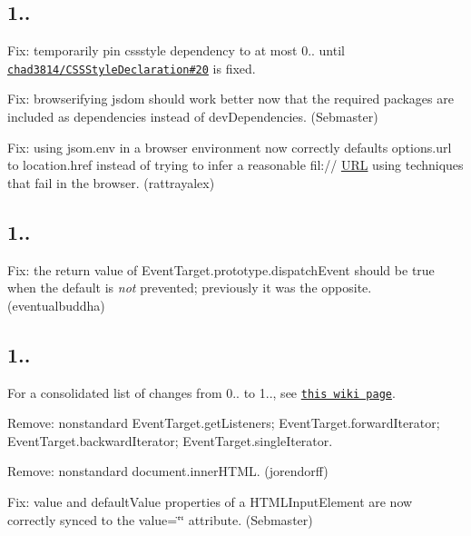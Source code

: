 \subsection*{1..}


\begin{DoxyItemize}
\item Fix\+: temporarily pin {\ttfamily cssstyle} dependency to at most 0.. until \href{https://github.com/chad3814/CSSStyleDeclaration/issues/20}{\tt chad3814/\+C\+S\+S\+Style\+Declaration\#20} is fixed.
\item Fix\+: browserifying jsdom should work better now that the required packages are included as {\ttfamily dependencies} instead of {\ttfamily dev\+Dependencies}. (Sebmaster)
\item Fix\+: using {\ttfamily jsom.\+env} in a browser environment now correctly defaults {\ttfamily options.\+url} to {\ttfamily location.\+href} instead of trying to infer a reasonable {\ttfamily fil\+://} \mbox{\hyperlink{namespace_u_r_l}{U\+RL}} using techniques that fail in the browser. (rattrayalex)
\end{DoxyItemize}

\subsection*{1..}


\begin{DoxyItemize}
\item Fix\+: the return value of {\ttfamily Event\+Target.\+prototype.\+dispatch\+Event} should be {\ttfamily true} when the default is {\itshape not} prevented; previously it was the opposite. (eventualbuddha)
\end{DoxyItemize}

\subsection*{1..}

For a consolidated list of changes from 0.. to 1.., see \href{https://github.com/tmpvar/jsdom/wiki/Changes-from-0.11.1-to-1.0.0}{\tt this wiki page}.


\begin{DoxyItemize}
\item Remove\+: nonstandard {\ttfamily Event\+Target.\+get\+Listeners}; {\ttfamily Event\+Target.\+forward\+Iterator}; {\ttfamily Event\+Target.\+backward\+Iterator}; {\ttfamily Event\+Target.\+single\+Iterator}.
\item Remove\+: nonstandard {\ttfamily document.\+inner\+H\+T\+ML}. (jorendorff)
\item Fix\+: {\ttfamily value} and {\ttfamily default\+Value} properties of a {\ttfamily H\+T\+M\+L\+Input\+Element} are now correctly synced to the {\ttfamily value=\char`\"{}\char`\"{}} attribute. (Sebmaster)
\end{DoxyItemize}

